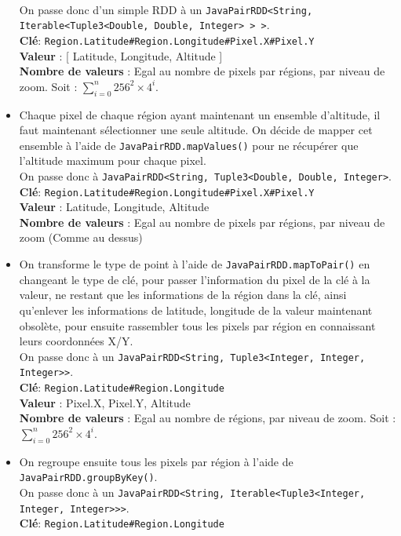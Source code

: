 \documentclass[a4paper]{article}
\begin{document}
\begin{itemize}
\\
On passe donc d'un simple RDD à un \texttt{JavaPairRDD<String, Iterable<Tuple3<Double, Double, Integer> > >}.
\\
\textbf{Clé}: \texttt{Region.Latitude\#Region.Longitude\#Pixel.X\#Pixel.Y}
\\
\textbf{Valeur}  : [ {Latitude, Longitude, Altitude} ]
\\
\textbf{Nombre de valeurs} : Egal au nombre de pixels par régions, par niveau de zoom. Soit : $\sum_{i=0}^{n} 256^{2} \times 4^{i}$.
\item Chaque pixel de chaque région ayant maintenant un ensemble d'altitude, il faut maintenant sélectionner une seule altitude. On décide de mapper cet ensemble à l'aide de \texttt{JavaPairRDD.mapValues()} pour ne récupérer que l'altitude maximum pour chaque pixel.
\\
On passe donc à \texttt{JavaPairRDD<String, Tuple3<Double, Double, Integer>}.
\\
\textbf{Clé}: \texttt{Region.Latitude\#Region.Longitude\#Pixel.X\#Pixel.Y}
\\
\textbf{Valeur}  : {Latitude, Longitude, Altitude}
\\
\textbf{Nombre de valeurs} : Egal au nombre de pixels par régions, par niveau de zoom (Comme au dessus)
\item On transforme le type de point à l'aide de \texttt{JavaPairRDD.mapToPair()} en changeant le type de clé, pour passer l'information du pixel de la clé à  la valeur, ne restant que les informations de la région dans la clé, ainsi qu'enlever les informations de latitude, longitude de la valeur maintenant obsolète, pour ensuite rassembler tous les pixels par région en connaissant leurs coordonnées X/Y.
\\
On passe donc à un \texttt{JavaPairRDD<String, Tuple3<Integer, Integer, Integer>>}.
\\
\textbf{Clé}: \texttt{Region.Latitude\#Region.Longitude}
\\
\textbf{Valeur}  : {Pixel.X, Pixel.Y, Altitude}
\\
\textbf{Nombre de valeurs} : Egal au nombre de régions, par niveau de zoom. Soit : $\sum_{i=0}^{n} 256^2 \times 4^{i}$.
\item On regroupe ensuite tous les pixels par région à l'aide de \texttt{JavaPairRDD.groupByKey()}.
\\
On passe donc à un \texttt{JavaPairRDD<String, Iterable<Tuple3<Integer, Integer, Integer>>>}.
\\
\textbf{Clé}: \texttt{Region.Latitude\#Region.Longitude}

\end{itemize}
\end{document}
